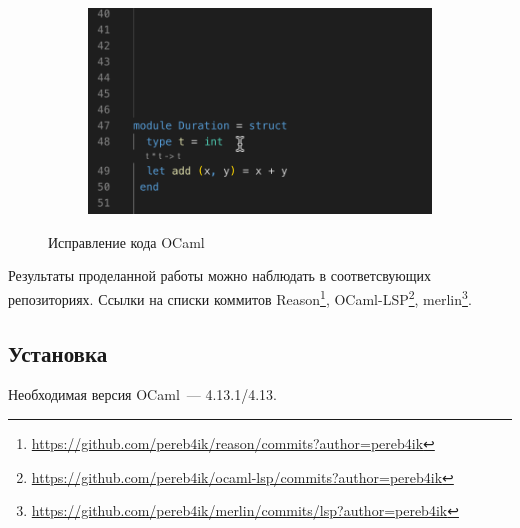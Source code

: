 \begin{figure}[h]
\begin{subfigure}{0.5\textwidth}
\end{subfigure}
\begin{subfigure}{0.5\textwidth}
	\includegraphics[width=\linewidth]{screenshots/04.png}
\end{subfigure}
\caption{Исправление кода OCaml}
	\label{fix}%
\end{figure}

Результаты проделанной работы можно наблюдать в соответсвующих репозиториях. Ссылки на списки коммитов Reason\footnote[1]{ \url{https://github.com/pereb4ik/reason/commits?author=pereb4ik} },
OCaml-LSP\footnote[2]{ \url{https://github.com/pereb4ik/ocaml-lsp/commits?author=pereb4ik} },
merlin\footnote[3]{ \url{https://github.com/pereb4ik/merlin/commits/lsp?author=pereb4ik} }.
\newpage

\subsection{Установка}
Необходимая версия OCaml~--- 4.13.1/4.13.
 
